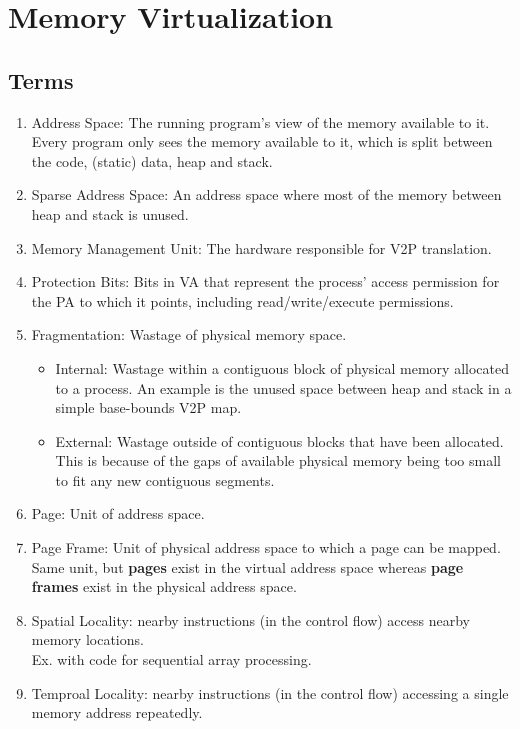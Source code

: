 \documentclass[10pt]{report}
\begin{document}
\chapter{Memory Virtualization}
\section*{Terms}
\begin{enumerate}
    \item Address Space: The running program's view of the memory available to it. Every program only sees the memory available to it, which is split between the code, (static) data, heap and stack.
    \item Sparse Address Space: An address space where most of the
    memory between heap and stack is unused.
    \item Memory Management Unit: The hardware responsible for V2P translation.
    \item Protection Bits: Bits in VA that represent the process'
    access permission for the PA to which it points, including read/write/execute permissions. 
    \item Fragmentation: Wastage of physical memory space.
    \begin{itemize}
        \item Internal: Wastage within a contiguous block of physical memory allocated to a process. An example is the unused space between heap and stack in a simple base-bounds V2P map.
        \item External: Wastage outside of contiguous blocks that have been allocated. This is because of the gaps of available physical memory being too small to fit any new contiguous segments. 
    \end{itemize}
    \item Page: Unit of address space.
    \item Page Frame: Unit of physical address space to which a page can be mapped. Same unit, but \textbf{pages} exist in the
    virtual address space whereas \textbf{page frames} exist
    in the physical address space.
    \item Spatial Locality: nearby instructions (in the control flow) access nearby memory locations.\\ Ex. with code for sequential array processing.
    \item Temproal Locality: nearby instructions (in the control flow) accessing a single memory address repeatedly.
\end{enumerate}
\end{document}
